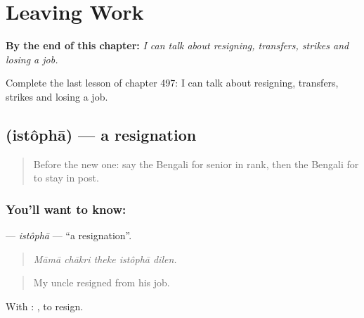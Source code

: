 
\chapter{Leaving Work}
\label{ch:bn-leaving-work}

\begin{chapteropening}
\textbf{By the end of this chapter:} \emph{I can talk about resigning, transfers, strikes and losing a job.}

Complete the last lesson of chapter 497: I can talk about resigning, transfers, strikes and losing a job.
\end{chapteropening}

\section[\texorpdfstring{\bn{ইস্তফা} (istôphā)}{ইস্তফা (istôphā)}]{ (istôphā) — a resignation}

\label{lesson:BN-C497-istopha}



\begin{quote}
Before the new one: say the Bengali for senior in rank, then the Bengali for to stay in post.
\end{quote}

\subsection*{You'll want to know: }
\textbf{} — \emph{istôphā} — \textquotedblleft{}a resignation\textquotedblright{}.

\begin{quote}
    
\end{quote}

\begin{quote}
\emph{Māmā chākri theke istôphā dilen.}
\end{quote}

\begin{quote}
My uncle resigned from his job.
\end{quote}

With :  , to resign.

